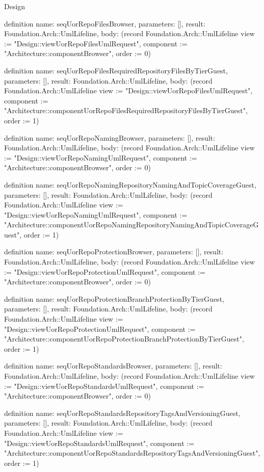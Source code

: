 \begin{lexlean}{Design}
\begin{semanticmodule}
definition{
  name: seqUorRepoFilesBrowser,
  parameters: [],
  result: Foundation.Arch::UmlLifeline,
  body: (record Foundation.Arch::UmlLifeline {view := "Design::viewUorRepoFilesUmlRequest", component := "Architecture::componentBrowser", order := 0})
}

definition{
  name: seqUorRepoFilesRequiredRepositoryFilesByTierGuest,
  parameters: [],
  result: Foundation.Arch::UmlLifeline,
  body: (record Foundation.Arch::UmlLifeline {view := "Design::viewUorRepoFilesUmlRequest", component := "Architecture::componentUorRepoFilesRequiredRepositoryFilesByTierGuest", order := 1})
}

definition{
  name: seqUorRepoNamingBrowser,
  parameters: [],
  result: Foundation.Arch::UmlLifeline,
  body: (record Foundation.Arch::UmlLifeline {view := "Design::viewUorRepoNamingUmlRequest", component := "Architecture::componentBrowser", order := 0})
}

definition{
  name: seqUorRepoNamingRepositoryNamingAndTopicCoverageGuest,
  parameters: [],
  result: Foundation.Arch::UmlLifeline,
  body: (record Foundation.Arch::UmlLifeline {view := "Design::viewUorRepoNamingUmlRequest", component := "Architecture::componentUorRepoNamingRepositoryNamingAndTopicCoverageGuest", order := 1})
}

definition{
  name: seqUorRepoProtectionBrowser,
  parameters: [],
  result: Foundation.Arch::UmlLifeline,
  body: (record Foundation.Arch::UmlLifeline {view := "Design::viewUorRepoProtectionUmlRequest", component := "Architecture::componentBrowser", order := 0})
}

definition{
  name: seqUorRepoProtectionBranchProtectionByTierGuest,
  parameters: [],
  result: Foundation.Arch::UmlLifeline,
  body: (record Foundation.Arch::UmlLifeline {view := "Design::viewUorRepoProtectionUmlRequest", component := "Architecture::componentUorRepoProtectionBranchProtectionByTierGuest", order := 1})
}

definition{
  name: seqUorRepoStandardsBrowser,
  parameters: [],
  result: Foundation.Arch::UmlLifeline,
  body: (record Foundation.Arch::UmlLifeline {view := "Design::viewUorRepoStandardsUmlRequest", component := "Architecture::componentBrowser", order := 0})
}

definition{
  name: seqUorRepoStandardsRepositoryTagsAndVersioningGuest,
  parameters: [],
  result: Foundation.Arch::UmlLifeline,
  body: (record Foundation.Arch::UmlLifeline {view := "Design::viewUorRepoStandardsUmlRequest", component := "Architecture::componentUorRepoStandardsRepositoryTagsAndVersioningGuest", order := 1})
}


\end{semanticmodule}
\end{lexlean}
